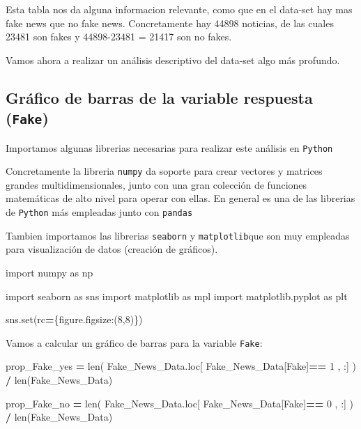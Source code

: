 \documentclass[
  11pt,
  a4paper,
]{article}
\newenvironment{Shaded}{\begin{snugshade}}{\end{snugshade}}
\newcommand{\BuiltInTok}[1]{#1}
\newcommand{\DecValTok}[1]{\textcolor[rgb]{0.00,0.00,0.81}{#1}}
\newcommand{\ImportTok}[1]{#1}
\newcommand{\NormalTok}[1]{#1}
\newcommand{\OperatorTok}[1]{\textcolor[rgb]{0.81,0.36,0.00}{\textbf{#1}}}
\newcommand{\StringTok}[1]{\textcolor[rgb]{0.31,0.60,0.02}{#1}}
\begin{document}
Esta tabla nos da alguna informacion relevante, como que en el data-set
hay mas fake news que no fake news. Concretamente hay 44898 noticias, de
las cuales 23481 son fakes y 44898-23481 = 21417 son no fakes.

Vamos ahora a realizar un análisis descriptivo del data-set algo más
profundo.

\hypertarget{gruxe1fico-de-barras-de-la-variable-respuesta-fake}{%
\subsection{\texorpdfstring{Gráfico de barras de la variable respuesta
(\texttt{Fake})}{Gráfico de barras de la variable respuesta (Fake)}}\label{gruxe1fico-de-barras-de-la-variable-respuesta-fake}}

Importamos algunas librerias necesarias para realizar este análisis en
\texttt{Python}

Concretamente la libreria \texttt{numpy} da soporte para crear vectores
y matrices grandes multidimensionales, junto con una gran colección de
funciones matemáticas de alto nivel para operar con ellas. En general es
una de las librerias de \texttt{Python} más empleadas junto con
\texttt{pandas}

Tambien importamos las librerias \texttt{seaborn} y
\texttt{matplotlib}que son muy empleadas para visualización de datos
(creación de gráficos).

\begin{Shaded}
\begin{Highlighting}[]
\ImportTok{import}\NormalTok{ numpy }\ImportTok{as}\NormalTok{ np}

\ImportTok{import}\NormalTok{ seaborn }\ImportTok{as}\NormalTok{ sns}
\ImportTok{import}\NormalTok{ matplotlib }\ImportTok{as}\NormalTok{ mpl}
\ImportTok{import}\NormalTok{ matplotlib.pyplot }\ImportTok{as}\NormalTok{ plt}

\NormalTok{sns.}\BuiltInTok{set}\NormalTok{(rc}\OperatorTok{=}\NormalTok{\{}\StringTok{\textquotesingle{}figure.figsize\textquotesingle{}}\NormalTok{:(}\DecValTok{8}\NormalTok{,}\DecValTok{8}\NormalTok{)\})}
\end{Highlighting}
\end{Shaded}

Vamos a calcular un gráfico de barras para la variable \texttt{Fake}:

\begin{Shaded}
\begin{Highlighting}[]
\NormalTok{prop\_Fake\_yes }\OperatorTok{=} \BuiltInTok{len}\NormalTok{( Fake\_News\_Data.loc[ Fake\_News\_Data[}\StringTok{\textquotesingle{}Fake\textquotesingle{}}\NormalTok{]}\OperatorTok{==} \DecValTok{1}\NormalTok{ , :] ) }\OperatorTok{/} \BuiltInTok{len}\NormalTok{(Fake\_News\_Data)}

\NormalTok{prop\_Fake\_no }\OperatorTok{=} \BuiltInTok{len}\NormalTok{( Fake\_News\_Data.loc[ Fake\_News\_Data[}\StringTok{\textquotesingle{}Fake\textquotesingle{}}\NormalTok{]}\OperatorTok{==} \DecValTok{0}\NormalTok{ , :] ) }\OperatorTok{/} \BuiltInTok{len}\NormalTok{(Fake\_News\_Data)}
\end{Highlighting}
\end{Shaded}
\end{document}
